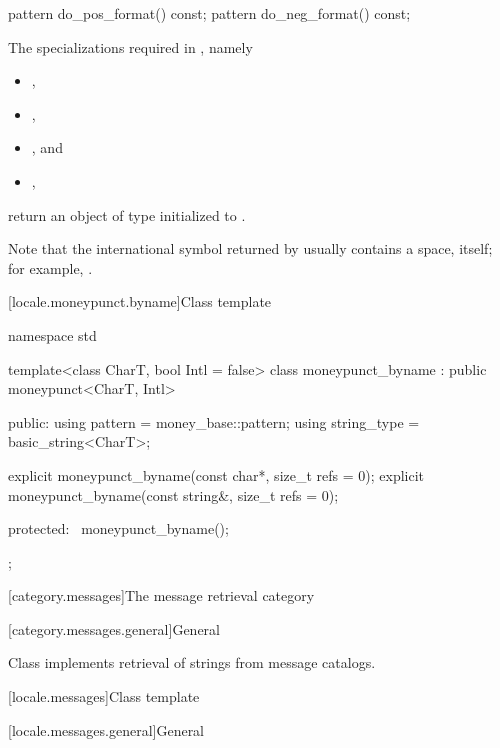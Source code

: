 %
%
\begin{itemdecl}
pattern do_pos_format() const;
pattern do_neg_format() const;
\end{itemdecl}

\begin{itemdescr}
\pnum
\returns
The specializations required in , namely
\begin{itemize}
\item {},
\item {},
\item {}, and
\item {},
\end{itemize}
return an object of type 
initialized to .
\begin{footnote}
Note that the international symbol returned by 
usually contains a space, itself;
for example, .
\end{footnote}
\end{itemdescr}

[locale.moneypunct.byname]{Class template }

%
\begin{codeblock}
namespace std {
  template<class CharT, bool Intl = false>
    class moneypunct_byname : public moneypunct<CharT, Intl> {
    public:
      using pattern     = money_base::pattern;
      using string_type = basic_string<CharT>;

      explicit moneypunct_byname(const char*, size_t refs = 0);
      explicit moneypunct_byname(const string&, size_t refs = 0);

    protected:
      ~moneypunct_byname();
    };
}
\end{codeblock}

[category.messages]{The message retrieval category}

[category.messages.general]{General}

\pnum
Class 
implements retrieval of strings from message catalogs.

[locale.messages]{Class template }

[locale.messages.general]{General}

